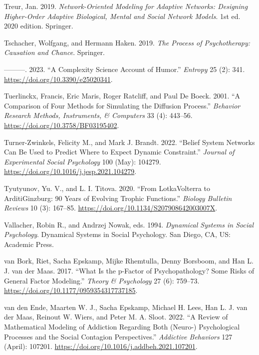 \documentclass[
  a4paper,
  DIV=11,
  numbers=noendperiod,
  oneside]{scrreprt}
\newlength{\cslhangindent}
\newenvironment{CSLReferences}[2] %
 {\begin{list}{}{%
  \setlength{\itemindent}{0pt}
  \setlength{\leftmargin}{0pt}
  \setlength{\parsep}{0pt}
  \ifodd #1
   \setlength{\leftmargin}{\cslhangindent}
   \setlength{\itemindent}{-1\cslhangindent}
  \fi
  \setlength{\itemsep}{#2\baselineskip}}}
 {\end{list}}
\begin{document}
\begin{CSLReferences}{1}{0}
Treur, Jan. 2019. \emph{Network-Oriented Modeling for Adaptive Networks:
Designing Higher-Order Adaptive Biological, Mental and Social Network
Models}. 1st ed. 2020 edition. Springer.

Tschacher, Wolfgang, and Hermann Haken. 2019. \emph{The Process of
Psychotherapy: Causation and Chance}. Springer.

---------. 2023. {``A Complexity Science Account of Humor.''}
\emph{Entropy} 25 (2): 341. \url{https://doi.org/10.3390/e25020341}.

Tuerlinckx, Francis, Eric Maris, Roger Ratcliff, and Paul De Boeck.
2001. {``A Comparison of Four Methods for Simulating the Diffusion
Process.''} \emph{Behavior Research Methods, Instruments, \& Computers}
33 (4): 443--56. \url{https://doi.org/10.3758/BF03195402}.

Turner-Zwinkels, Felicity M., and Mark J. Brandt. 2022. {``Belief System
Networks Can Be Used to Predict Where to Expect Dynamic Constraint.''}
\emph{Journal of Experimental Social Psychology} 100 (May): 104279.
\url{https://doi.org/10.1016/j.jesp.2021.104279}.

Tyutyunov, Yu. V., and L. I. Titova. 2020. {``From
Lotka{\textendash}Volterra to Arditi{\textendash}Ginzburg: 90 Years of
Evolving Trophic Functions.''} \emph{Biology Bulletin Reviews} 10 (3):
167--85. \url{https://doi.org/10.1134/S207908642003007X}.

Vallacher, Robin R., and Andrzej Nowak, eds. 1994. \emph{Dynamical
Systems in Social Psychology}. Dynamical Systems in Social Psychology.
{San Diego, CA, US}: {Academic Press}.

van Bork, Riet, Sacha Epskamp, Mijke Rhemtulla, Denny Borsboom, and Han
L. J. van der Maas. 2017. {``What Is the p-Factor of Psychopathology?
{Some} Risks of General Factor Modeling.''} \emph{Theory \& Psychology}
27 (6): 759--73. \url{https://doi.org/10.1177/0959354317737185}.

van den Ende, Maarten W. J., Sacha Epskamp, Michael H. Lees, Han L. J.
van der Maas, Reinout W. Wiers, and Peter M. A. Sloot. 2022. {``A Review
of Mathematical Modeling of Addiction Regarding Both (Neuro-)
Psychological Processes and the Social Contagion Perspectives.''}
\emph{Addictive Behaviors} 127 (April): 107201.
\url{https://doi.org/10.1016/j.addbeh.2021.107201}.


\end{CSLReferences}
\end{document}
